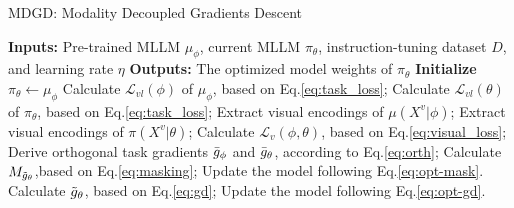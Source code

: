 


\begin{algorithm}[ht]
\caption{MDGD: Modality Decoupled Gradients Descent }
\label{alg}
\begin{algorithmic}[1]
\State \textbf{Inputs:} 
Pre-trained MLLM $\mu_\phi$, current MLLM $\pi_\theta$, instruction-tuning dataset $D$, and learning rate $\eta$
\State \textbf{Outputs:} The optimized model weights of $\pi_\theta$
\State \textbf{Initialize} $\pi_\theta \leftarrow \mu_\phi$
    \State Calculate $\mathcal{L}_{vl}(\phi)$ of $\mu_\phi$, based on Eq.\eqref{eq:task_loss};
    \State Calculate $\mathcal{L}_{vl}(\theta)$ of $\pi_\theta$, based on Eq.\eqref{eq:task_loss};
    \State Extract visual encodings of $\mu(X^v|\phi)$;
    \State Extract visual encodings of $\pi(X^v|\theta)$;
    \State Calculate $\mathcal{L}_v(\phi,\theta)$, based on Eq.\eqref{eq:visual_loss};
    \State Derive orthogonal task gradients $\Bar{g}_\phi$ and $\Bar{g}_\theta$, according to Eq.\eqref{eq:orth};
        \State Calculate $M_{\Tilde{g}_\theta}$,based on Eq.\eqref{eq:masking};
        \State Update the model following Eq.\eqref{eq:opt-mask}.
    \Else
        \State Calculate $\Tilde{g}_\theta$, based on Eq.\eqref{eq:gd};
        \State Update the model following Eq.\eqref{eq:opt-gd}.
    \EndIf
\EndFor
\end{algorithmic}
\end{algorithm}

